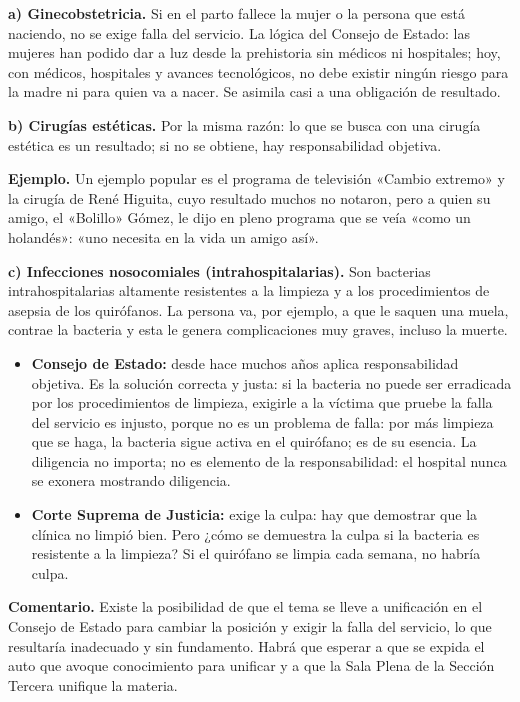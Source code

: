 \textbf{a) Ginecobstetricia.} Si en el parto fallece la mujer o la persona que está naciendo, no se exige falla del servicio. La lógica del Consejo de Estado: las mujeres han podido dar a luz desde la prehistoria sin médicos ni hospitales; hoy, con médicos, hospitales y avances tecnológicos, no debe existir ningún riesgo para la madre ni para quien va a nacer. Se asimila casi a una obligación de resultado.

\textbf{b) Cirugías estéticas.} Por la misma razón: lo que se busca con una cirugía estética es un resultado; si no se obtiene, hay responsabilidad objetiva.

\begin{ejemplo}
\textcolor[HTML]{4F6228}{\textbf{Ejemplo. }}Un ejemplo popular es el programa de televisión «Cambio extremo» y la cirugía de René Higuita, cuyo resultado muchos no notaron, pero a quien su amigo, el «Bolillo» Gómez, le dijo en pleno programa que se veía «como un holandés»: «uno necesita en la vida un amigo así».
\end{ejemplo}
\textbf{c) Infecciones nosocomiales (intrahospitalarias).} Son bacterias intrahospitalarias altamente resistentes a la limpieza y a los procedimientos de asepsia de los quirófanos. La persona va, por ejemplo, a que le saquen una muela, contrae la bacteria y esta le genera complicaciones muy graves, incluso la muerte.

\begin{itemize}
\item \textbf{Consejo de Estado:} desde hace muchos años aplica responsabilidad objetiva. Es la solución correcta y justa: si la bacteria no puede ser erradicada por los procedimientos de limpieza, exigirle a la víctima que pruebe la falla del servicio es injusto, porque no es un problema de falla: por más limpieza que se haga, la bacteria sigue activa en el quirófano; es de su esencia. La diligencia no importa; no es elemento de la responsabilidad: el hospital nunca se exonera mostrando diligencia.
\item \textbf{Corte Suprema de Justicia:} exige la culpa: hay que demostrar que la clínica no limpió bien. Pero ¿cómo se demuestra la culpa si la bacteria es resistente a la limpieza? Si el quirófano se limpia cada semana, no habría culpa.
\end{itemize}
\begin{comentario}
\textcolor[HTML]{8A6D3B}{\textbf{Comentario. }}Existe la posibilidad de que el tema se lleve a unificación en el Consejo de Estado para cambiar la posición y exigir la falla del servicio, lo que resultaría inadecuado y sin fundamento. Habrá que esperar a que se expida el auto que avoque conocimiento para unificar y a que la Sala Plena de la Sección Tercera unifique la materia.
\end{comentario}
